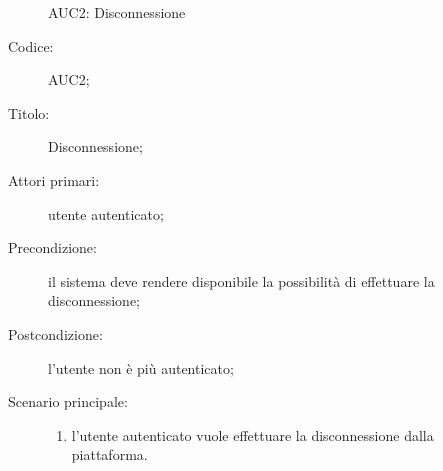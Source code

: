 \documentclass[../../../analisi-dei-requisiti.tex]{subfiles}
\begin{document}
\begin{figure}[H]
  \centering
  \caption{AUC2: Disconnessione}%
  \label{fig:AUC2}
\end{figure}

\begin{description}
  \item[Codice:] AUC2;
  \item[Titolo:] Disconnessione;
  \item[Attori primari:] utente autenticato;
  \item[Precondizione:] il sistema deve rendere disponibile la possibilità di effettuare la disconnessione;
  \item[Postcondizione:] l'utente non è più autenticato;
  \item[Scenario principale:]
  \begin{enumerate}
    \item l'utente autenticato vuole effettuare la disconnessione dalla piattaforma.
  \end{enumerate}
\end{description}
\end{document}
